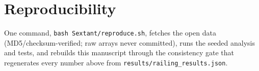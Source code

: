 \documentclass[11pt]{article}
\begin{document}
\section*{Reproducibility}
One command, \texttt{bash Sextant/reproduce.sh}, fetches the open data
(MD5/checksum-verified; raw arrays never committed), runs the seeded analysis and
tests, and rebuilds this manuscript through the consistency gate that regenerates
every number above from \texttt{results/railing\_results.json}.
\end{document}
